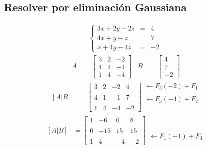 \documentclass[10pt, a4paper]{article}
\begin{document}
\subsection{Resolver por eliminación Gaussiana}
\begin{align*}
  \left\{
  \begin{array}{rcl}
    3x+2y-2z &= &4\\
    4x+y-z &= &7\\
    x+4y-4z &= &-2
  \end{array}
  \right.\
\end{align*}
  \begin{align*}
    A &= \begin{bmatrix}
      3 & 2 & -2\\
      4 & 1 & -1\\
      1 & 4 & -4
    \end{bmatrix}&
    B &= \begin{bmatrix}
      4\\
      7\\
      -2
    \end{bmatrix}
  \end{align*}
  \begin{align*}
    \left[A|B\right]&=\left[
      \begin{array}{ccc|c}
        3 & 2 & -2 & 4 \\\\
        4 & 1 & -1 & 7 \\\\
        1 & 4 & -4 & -2
      \end{array}
    \right]
    \begin{array}{r}
      \leftarrow F_3\left(-2\right)+F_1 \\\\
      \leftarrow F_3\left(-4\right)+F_2 \\\\
      \\
    \end{array}
  \end{align*}
  \begin{align*}
    \left[A|B\right]&=\left[
      \begin{array}{ccc|c}
        1 & -6 & 6 & 8 \\\\
        0 & -15 & 15 & 15 \\\\
        1 & 4 & -4 & -2
      \end{array}
    \right]
    \begin{array}{r}
      \\\\\\\\
      \leftarrow F_1\left(-1\right)+F_3
    \end{array}
  \end{align*}
\end{document}
